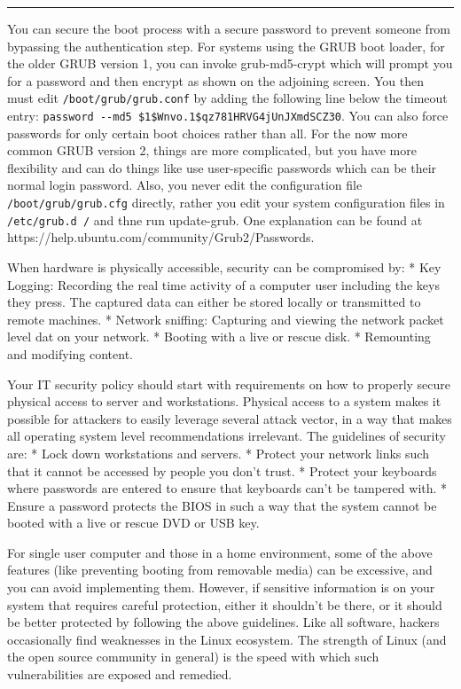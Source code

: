 \begin{center}\rule{3in}{0.4pt}\end{center}

You can secure the boot process with a secure password to prevent
someone from bypassing the authentication step. For systems using the
GRUB boot loader, for the older GRUB version 1, you can invoke
grub-md5-crypt which will prompt you for a password and then encrypt as
shown on the adjoining screen. You then must edit
\texttt{/boot/grub/grub.conf} by adding the following line below the
timeout entry:
\texttt{password -\/-md5 \$1\$Wnvo.1\$qz781HRVG4jUnJXmdSCZ30}. You can
also force passwords for only certain boot choices rather than all. For
the now more common GRUB version 2, things are more complicated, but you
have more flexibility and can do things like use user-specific passwords
which can be their normal login password. Also, you never edit the
configuration file \texttt{/boot/grub/grub.cfg} directly, rather you
edit your system configuration files in \texttt{/etc/grub.d /} and thne
run update-grub. One explanation can be found at
https://help.ubuntu.com/community/Grub2/Passwords.

When hardware is physically accessible, security can be compromised by:
* Key Logging: Recording the real time activity of a computer user
including the keys they press. The captured data can either be stored
locally or transmitted to remote machines. * Network sniffing: Capturing
and viewing the network packet level dat on your network. * Booting with
a live or rescue disk. * Remounting and modifying content.

Your IT security policy should start with requirements on how to
properly secure physical access to server and workstations. Physical
access to a system makes it possible for attackers to easily leverage
several attack vector, in a way that makes all operating system level
recommendations irrelevant. The guidelines of security are: * Lock down
workstations and servers. * Protect your network links such that it
cannot be accessed by people you don't trust. * Protect your keyboards
where passwords are entered to ensure that keyboards can't be tampered
with. * Ensure a password protects the BIOS in such a way that the
system cannot be booted with a live or rescue DVD or USB key.

For single user computer and those in a home environment, some of the
above features (like preventing booting from removable media) can be
excessive, and you can avoid implementing them. However, if sensitive
information is on your system that requires careful protection, either
it shouldn't be there, or it should be better protected by following the
above guidelines. Like all software, hackers occasionally find
weaknesses in the Linux ecosystem. The strength of Linux (and the open
source community in general) is the speed with which such
vulnerabilities are exposed and remedied.

